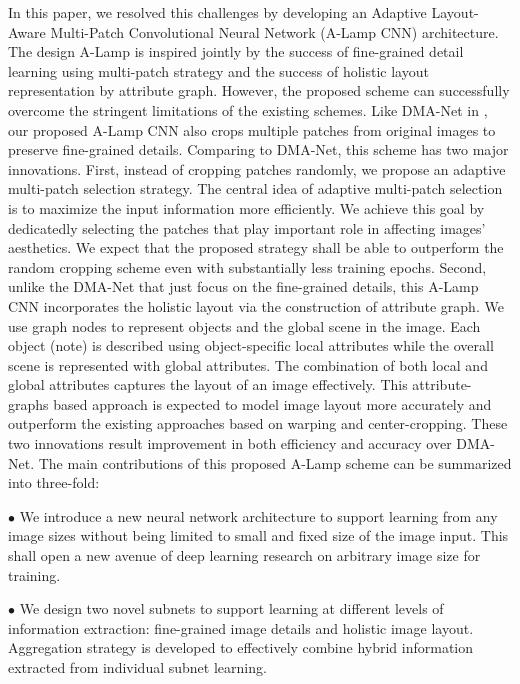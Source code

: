 \documentclass[10pt,twocolumn,letterpaper]{article}
\begin{document}
	In this paper, we resolved this challenges by developing an Adaptive Layout-Aware Multi-Patch Convolutional Neural Network (A-Lamp CNN) architecture. The design A-Lamp is inspired jointly by the success of fine-grained detail learning using multi-patch strategy \cite{Lu:2015:ICCV,Liu:2016:CVPR:multi_patch} and the success of holistic layout representation by attribute graph. However, the proposed scheme can successfully overcome the stringent limitations of the existing schemes.
	Like DMA-Net in \cite{Lu:2015:ICCV}, our proposed A-Lamp CNN also crops multiple patches from original images to preserve fine-grained details. Comparing to DMA-Net, this scheme has two major innovations. First, instead of cropping patches randomly, we propose an adaptive multi-patch selection strategy. The central idea of adaptive multi-patch selection is to maximize the input information more efficiently. We achieve this goal by dedicatedly selecting the patches that play important role in affecting images' aesthetics. We expect that the proposed strategy shall be able to outperform the random cropping scheme even with substantially less training epochs. Second, unlike the DMA-Net that just focus on the fine-grained details, this A-Lamp CNN incorporates the holistic layout via the construction of attribute graph. We use graph nodes to represent objects and the global scene in the image. Each object (note) is described using object-specific local attributes while the overall scene is represented with global attributes. The combination of both local and global attributes captures the layout of an image effectively. This attribute-graphs based approach is expected to model image layout more accurately and outperform the existing approaches based on warping and center-cropping. These two innovations result improvement in both efficiency and accuracy over DMA-Net. The main contributions of this proposed A-Lamp scheme can be summarized into three-fold:
	


	$\bullet$ We introduce a new neural network architecture to support learning from any image sizes without being limited to small and fixed size of the image input. This shall open a new avenue of deep learning research on arbitrary image size for training.
	
	$\bullet$ We design two novel subnets to support learning at different levels of information extraction: fine-grained image details and holistic image layout. Aggregation strategy is developed to effectively combine hybrid information extracted from individual subnet learning.
	
\end{document}
